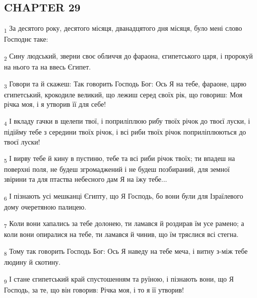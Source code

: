 \subsection{CHAPTER 29}
\begin{tcolorbox}
\textsubscript{1} За десятого року, десятого місяця, дванадцятого дня місяця, було мені слово Господнє таке:
\end{tcolorbox}
\begin{tcolorbox}
\textsubscript{2} Сину людський, зверни своє обличчя до фараона, єгипетського царя, і пророкуй на нього та на ввесь Єгипет.
\end{tcolorbox}
\begin{tcolorbox}
\textsubscript{3} Говори та й скажеш: Так говорить Господь Бог: Ось Я на тебе, фараоне, царю єгипетський, крокодиле великий, що лежиш серед своїх рік, що говориш: Моя річка моя, і я утворив її для себе!
\end{tcolorbox}
\begin{tcolorbox}
\textsubscript{4} І вкладу гачки в щелепи твої, і поприліплюю рибу твоїх річок до твоєї луски, і підійму тебе з середини твоїх річок, і всі риби твоїх річок поприліплюються до твоєї луски!
\end{tcolorbox}
\begin{tcolorbox}
\textsubscript{5} І вирву тебе й кину в пустиню, тебе та всі риби річок твоїх; ти впадеш на поверхні поля, не будеш згромаджений і не будеш позбираний, для земної звірини та для птаства небесного дам Я на їжу тебе...
\end{tcolorbox}
\begin{tcolorbox}
\textsubscript{6} І пізнають усі мешканці Єгипту, що Я Господь, бо вони були для Ізраїлевого дому очеретяною палицею.
\end{tcolorbox}
\begin{tcolorbox}
\textsubscript{7} Коли вони хапались за тебе долонею, ти ламався й роздирав їм усе рамено; а коли вони опиралися на тебе, ти ламався й чинив, що їм тряслися всі стегна.
\end{tcolorbox}
\begin{tcolorbox}
\textsubscript{8} Тому так говорить Господь Бог: Ось Я наведу на тебе меча, і витну з-між тебе людину й скотину.
\end{tcolorbox}
\begin{tcolorbox}
\textsubscript{9} І стане єгипетський край спустошенням та руїною, і пізнають вони, що Я Господь, за те, що він говорив: Річка моя, і то я її утворив!
\end{tcolorbox}
